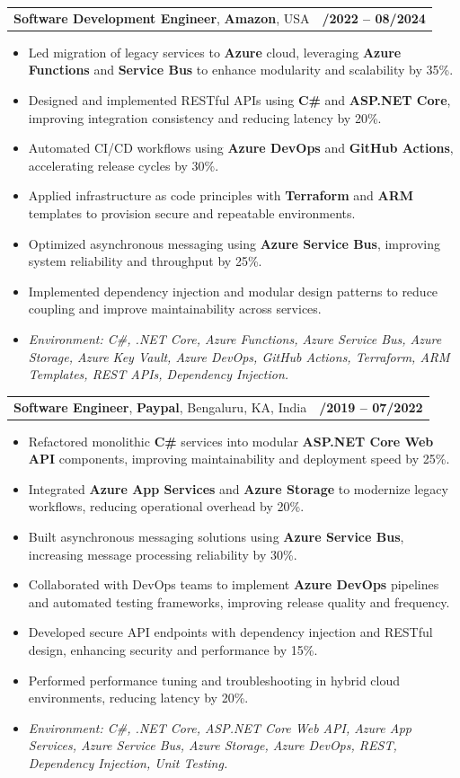\documentclass[letterpaper,11pt]{article}
\makeatletter
\newcommand{\resumeItem}[1]{
  \item\footnotesize{
    {#1 \vspace{-2pt}}
  }
}
\newcommand{\resumeSubheading}[4]{
  \vspace{-2pt}\item
    \begin{tabular*}{1.0\textwidth}[t]{l@{\extracolsep{\fill}}r}
      \textbf{\fontsize{10pt}{14pt}\selectfont #3}, \textbf{\fontsize{10pt}{14pt}\selectfont #1}, \fontsize{10pt}{14pt}\selectfont #4 & \textbf{\fontsize{10pt}{14pt}\selectfont #2} \\
    \end{tabular*}\vspace{-7pt}
}
\newcommand{\resumeItemListStart}{\begin{itemize}[leftmargin=*]}
\newcommand{\resumeItemListEnd}{\end{itemize}\vspace{-5pt}}
\makeatother
\begin{document}
\resumeSubheading
{Amazon}{10/2022 -- 08/2024}
{Software Development Engineer}{USA}
\resumeItemListStart
  \resumeItem{Led migration of legacy services to \textbf{Azure} cloud, leveraging \textbf{Azure Functions} and \textbf{Service Bus} to enhance modularity and scalability by 35\%.}
  \resumeItem{Designed and implemented RESTful APIs using \textbf{C\#} and \textbf{ASP.NET Core}, improving integration consistency and reducing latency by 20\%.}
  \resumeItem{Automated CI/CD workflows using \textbf{Azure DevOps} and \textbf{GitHub Actions}, accelerating release cycles by 30\%.}
  \resumeItem{Applied infrastructure as code principles with \textbf{Terraform} and \textbf{ARM} templates to provision secure and repeatable environments.}
  \resumeItem{Optimized asynchronous messaging using \textbf{Azure Service Bus}, improving system reliability and throughput by 25\%.}
  \resumeItem{Implemented dependency injection and modular design patterns to reduce coupling and improve maintainability across services.}
  \resumeItem{\textit{Environment: C\#, .NET Core, Azure Functions, Azure Service Bus, Azure Storage, Azure Key Vault, Azure DevOps, GitHub Actions, Terraform, ARM Templates, REST APIs, Dependency Injection.}}
\resumeItemListEnd

\resumeSubheading
{Paypal}{08/2019 -- 07/2022}
{Software Engineer}{Bengaluru, KA, India}
\resumeItemListStart
  \resumeItem{Refactored monolithic \textbf{C\#} services into modular \textbf{ASP.NET Core Web API} components, improving maintainability and deployment speed by 25\%.}
  \resumeItem{Integrated \textbf{Azure App Services} and \textbf{Azure Storage} to modernize legacy workflows, reducing operational overhead by 20\%.}
  \resumeItem{Built asynchronous messaging solutions using \textbf{Azure Service Bus}, increasing message processing reliability by 30\%.}
  \resumeItem{Collaborated with DevOps teams to implement \textbf{Azure DevOps} pipelines and automated testing frameworks, improving release quality and frequency.}
  \resumeItem{Developed secure API endpoints with dependency injection and RESTful design, enhancing security and performance by 15\%.}
  \resumeItem{Performed performance tuning and troubleshooting in hybrid cloud environments, reducing latency by 20\%.}
  \resumeItem{\textit{Environment: C\#, .NET Core, ASP.NET Core Web API, Azure App Services, Azure Service Bus, Azure Storage, Azure DevOps, REST, Dependency Injection, Unit Testing.}}
\resumeItemListEnd
\end{document}
